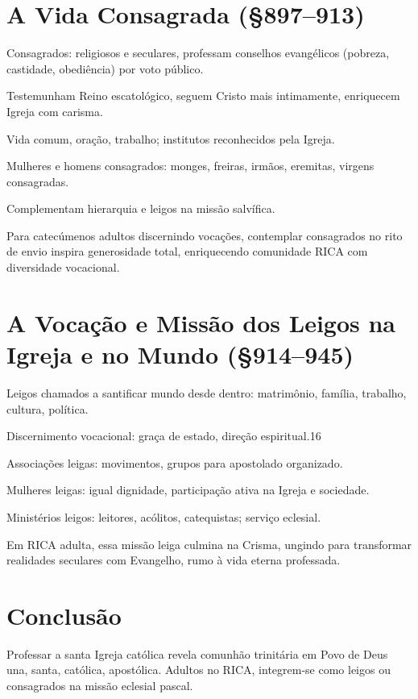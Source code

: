 \section{A Vida Consagrada (\S 897--913)}

Consagrados: religiosos e seculares, professam conselhos evangélicos (pobreza, castidade, obediência) por voto público.

Testemunham Reino escatológico, seguem Cristo mais intimamente, enriquecem Igreja com carisma.

Vida comum, oração, trabalho; institutos reconhecidos pela Igreja.

Mulheres e homens consagrados: monges, freiras, irmãos, eremitas, virgens consagradas.

Complementam hierarquia e leigos na missão salvífica.

Para catecúmenos adultos discernindo vocações, contemplar consagrados no rito de envio inspira generosidade total, enriquecendo comunidade RICA com diversidade vocacional.

\section{A Vocação e Missão dos Leigos na Igreja e no Mundo (\S 914--945)}

Leigos chamados a santificar mundo desde dentro: matrimônio, família, trabalho, cultura, política.

Discernimento vocacional: graça de estado, direção espiritual.16

Associações leigas: movimentos, grupos para apostolado organizado.

Mulheres leigas: igual dignidade, participação ativa na Igreja e sociedade.

Ministérios leigos: leitores, acólitos, catequistas; serviço eclesial.

Em RICA adulta, essa missão leiga culmina na Crisma, ungindo para transformar realidades seculares com Evangelho, rumo à vida eterna professada.

\section{Conclusão}

Professar a santa Igreja católica revela comunhão trinitária em Povo de Deus una, santa, católica, apostólica. Adultos no RICA, integrem-se como leigos ou consagrados na missão eclesial pascal.